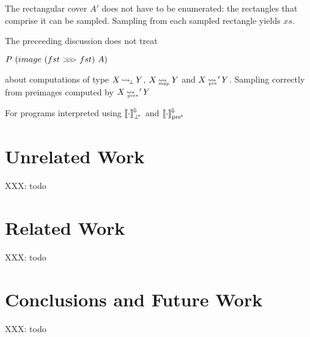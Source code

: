 \documentclass[preprint]{sigplanconf}
\newcommand{\arrow}{\rightsquigarrow}
\newcommand{\conv}{^{\mspace{-2mu}\Downarrow\mspace{-2mu}}}
\newcommand{\meaningofconv}[1]{\left\llbracket{#1}\right\rrbracket\conv}
\newcommand{\arrowcomp}{\ensuremath{{>}\mspace{-6mu}{>}\mspace{-6mu}{>}}}
\DeclareMathOperator{\botto}{\arrow_{\mspace{-3mu}\bot}}
\newcommand{\map}{_\mathrm{map}}
\DeclareMathOperator{\mapto}{\arrow_{\mspace{-21mu}\map}}
\newcommand{\pre}{_\mathrm{pre}}
\DeclareMathOperator{\preto}{\arrow_{\mspace{-19mu}\pre}}
\newcommand{\pbot}{{\bot^{\mspace{-4mu}*}}}
\newcommand{\ppre}{_\mathrm{pre^{\mspace{-2mu}*}}}
\DeclareMathOperator{\ppreto}{\arrow_{\mspace{-19mu}_{\mathrm{pre*}}}}
\begin{document}
The rectangular cover $A'$ does not have to be enumerated: the rectangles that comprise it can be sampled.
Sampling from each sampled rectangle yields $xs$.

The preceeding discussion does not treat 

$P~(image~(fst~\arrowcomp~fst)~A)$

about computations of type $X \botto Y$, $X \mapto Y$ and $X \preto' Y$.
Sampling correctly from preimages computed by $X \ppreto' Y$ 


For programs interpreted using $\meaningofconv{\cdot}_\pbot$ and $\meaningofconv{\cdot}\ppre$


\section{Unrelated Work}

XXX: todo


\section{Related Work}

XXX: todo


\section{Conclusions and Future Work}

XXX: todo








\end{document}
